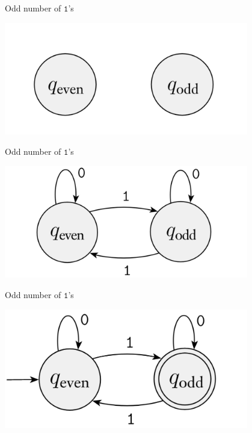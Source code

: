 \documentclass[aspectratio=169, handout]{beamer}
\begin{document}
\begin{frame}{Odd number of $\texttt{1}$'s}
    \begin{center}
        \includegraphics[width=0.8\textwidth]{noTransitions.png}
    \end{center}
\end{frame}

\begin{frame}{Odd number of $\texttt{1}$'s}
    \begin{center}
        \includegraphics[width=0.8\textwidth]{noAccept.png}
    \end{center}
\end{frame}

\begin{frame}{Odd number of $\texttt{1}$'s}
    \begin{center}
        \includegraphics[width=0.8\textwidth]{evenDFA.png}
    \end{center}
\end{frame}
\end{document}
